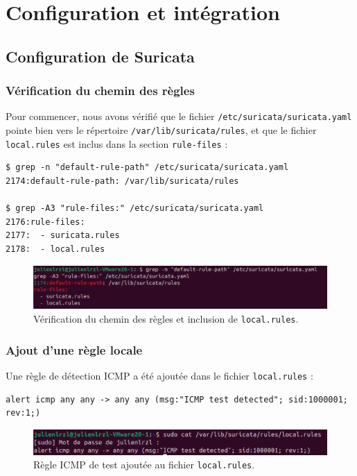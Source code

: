 \chapter{Configuration et intégration}
\label{chap:chap_2}

\section{Configuration de Suricata}

\subsection{Vérification du chemin des règles}
Pour commencer, nous avons vérifié que le fichier \texttt{/etc/suricata/suricata.yaml} pointe bien vers le répertoire \texttt{/var/lib/suricata/rules}, et que le fichier \texttt{local.rules} est inclus dans la section \texttt{rule-files} :

\begin{verbatim}
$ grep -n "default-rule-path" /etc/suricata/suricata.yaml
2174:default-rule-path: /var/lib/suricata/rules

$ grep -A3 "rule-files:" /etc/suricata/suricata.yaml
2176:rule-files:
2177:  - suricata.rules
2178:  - local.rules
\end{verbatim}

\begin{figure}[H]
    \centering
    \includegraphics[width=0.9\linewidth]{assets/figures/suricata-rulefiles.png}
    \caption{Vérification du chemin des règles et inclusion de \texttt{local.rules}.}
\end{figure}

\subsection{Ajout d'une règle locale}
Une règle de détection ICMP a été ajoutée dans le fichier \texttt{local.rules} :

\begin{verbatim}
alert icmp any any -> any any (msg:"ICMP test detected"; sid:1000001; rev:1;)
\end{verbatim}


\begin{figure}[H]
    \centering
    \includegraphics[width=0.9\linewidth]{assets/figures/local-rules.png}
    \caption{Règle ICMP de test ajoutée au fichier \texttt{local.rules}.}
\end{figure}

